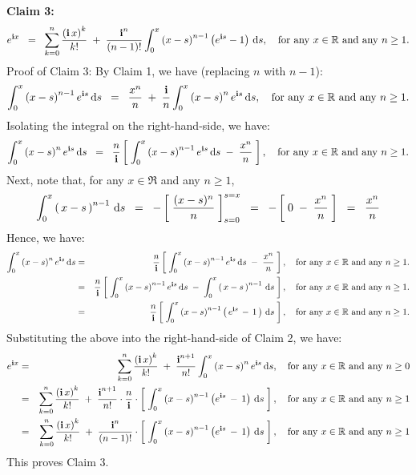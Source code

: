 \vskip 0.5cm
\noindent
\textbf{Claim 3:}
\begin{equation*}
e^{\textnormal{\bf i} x}
\;\;=\;\;
\sum_{k=0}^{n}\dfrac{\left(\textnormal{\bf i}\,x\right)^{k}}{k!}
\;+\; \dfrac{\textnormal{\bf i}^{n}}{(n-1)!}\int_{0}^{x}\left(x-s\right)^{n-1}\left(e^{\textnormal{\bf i} s}-1\right)\,\textnormal{d} s,
\quad
\textnormal{for any $x \in \mathbb{R}$ and any $n \geq 1$.}
\end{equation*}
{\small Proof of Claim 3: By Claim 1, we have (replacing $n$ with $n-1$):
\begin{equation*}
\int_{0}^{x}\left(x-s\right)^{n-1}e^{\textnormal{\bf i} s}\,\textnormal{d} s
\;\;=\;\;
\dfrac{x^{n}}{n} \;+\; \dfrac{\textnormal{\bf i}}{n}\int_{0}^{x}\left(x-s\right)^{n}e^{\textnormal{\bf i} s}\,\textnormal{d} s,
\quad
\textnormal{for any $x \in \mathbb{R}$ and any $n \geq 1$}.
\end{equation*}
Isolating the integral on the right-hand-side, we have:
\begin{equation*}
\int_{0}^{x}\left(x-s\right)^{n}e^{\textnormal{\bf i} s}\,\textnormal{d} s
\;\;=\;\;
\frac{n}{\textnormal{\bf i}}\left[\;
\int_{0}^{x}\left(x-s\right)^{n-1}e^{\textnormal{\bf i} s}\,\textnormal{d} s
\; - \;
\dfrac{x^{n}}{n}
\;\right],
\quad
\textnormal{for any $x \in \mathbb{R}$ and any $n \geq 1$}.
\end{equation*}
Next, note that, for any $x \in \Re$ and any $n \geq 1$,
\begin{equation*}
\int_{0}^{x}\left(\,x-s\,\right)^{n-1}\,\textnormal{d} s
\;\;=\;\; - \left[\;\dfrac{(x-s)^{n}}{n}\;\right]_{s=0}^{s=x}
\;\;=\;\; - \left[\;0 \; - \; \dfrac{x^{n}}{n}\;\right]
\;\;=\;\; \dfrac{x^{n}}{n}
\end{equation*}
Hence, we have:
\begin{eqnarray*}
\int_{0}^{x}\left(x-s\right)^{n}e^{\textnormal{\bf i} s}\,\textnormal{d} s
&=&
\frac{n}{\textnormal{\bf i}}\left[\;
\int_{0}^{x}\left(x-s\right)^{n-1}e^{\textnormal{\bf i} s}\,\textnormal{d} s
\; - \;
\dfrac{x^{n}}{n}
\;\right],
\quad
\textnormal{for any $x \in \mathbb{R}$ and any $n \geq 1$}.
\\
&=&
\frac{n}{\textnormal{\bf i}}\left[\;
\int_{0}^{x}\left(x-s\right)^{n-1}e^{\textnormal{\bf i} s}\,\textnormal{d} s
\; - \;
\int_{0}^{x}\left(\,x-s\,\right)^{n-1}\,\textnormal{d} s
\;\right],
\quad
\textnormal{for any $x \in \mathbb{R}$ and any $n \geq 1$}.
\\
&=&
\frac{n}{\textnormal{\bf i}}\left[\;
\int_{0}^{x}\left(x-s\right)^{n-1}\left(\,e^{\textnormal{\bf i} s}\,-\,1\,\right)\,\textnormal{d} s
\;\right],
\quad
\textnormal{for any $x \in \mathbb{R}$ and any $n \geq 1$}.
\end{eqnarray*}
Substituting the above into the right-hand-side of Claim 2, we have:
\begin{eqnarray*}
e^{\textnormal{\bf i} x}
&=&
\sum_{k=0}^{n}\dfrac{\left(\textnormal{\bf i}\,x\right)^{k}}{k!}
\;+\; \dfrac{\textnormal{\bf i}^{n+1}}{n!}\int_{0}^{x}\left(x-s\right)^{n}e^{\textnormal{\bf i} s}\,\textnormal{d} s,
\quad
\textnormal{for any $x \in \mathbb{R}$ and any $n \geq 0$}
\\
&=&
\sum_{k=0}^{n}\dfrac{\left(\textnormal{\bf i}\,x\right)^{k}}{k!}
\;+\; \dfrac{\textnormal{\bf i}^{n+1}}{n!}\cdot\frac{n}{\textnormal{\bf i}}\cdot
\left[\;
\int_{0}^{x}\left(x-s\right)^{n-1}\left(e^{\textnormal{\bf i} s}\,-\,1\right)\,\textnormal{d} s
\;\right],
\quad
\textnormal{for any $x \in \mathbb{R}$ and any $n \geq 1$}
\\
&=&
\sum_{k=0}^{n}\dfrac{\left(\textnormal{\bf i}\,x\right)^{k}}{k!}
\;+\; \dfrac{\textnormal{\bf i}^{n}}{(n-1)!}\cdot
\left[\;
\int_{0}^{x}\left(x-s\right)^{n-1}\left(e^{\textnormal{\bf i} s}\,-\,1\right)\,\textnormal{d} s
\;\right],
\quad
\textnormal{for any $x \in \mathbb{R}$ and any $n \geq 1$}
\end{eqnarray*}
This proves Claim 3.
}

